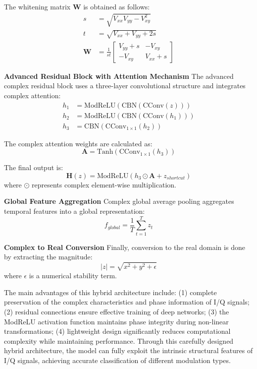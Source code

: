 \documentclass[conference]{IEEEtran}
\begin{document}
The whitening matrix $\mathbf{W}$ is obtained as follows:
\begin{align}
s &= \sqrt{V_{xx}V_{yy} - V_{xy}^2} \\
t &= \sqrt{V_{xx} + V_{yy} + 2s} \\
\mathbf{W} &= \frac{1}{st}\begin{bmatrix} V_{yy} + s & -V_{xy} \\ -V_{xy} & V_{xx} + s \end{bmatrix}
\end{align}

\textbf{Advanced Residual Block with Attention Mechanism} The advanced complex residual block uses a three-layer convolutional structure and integrates complex attention:
\begin{align}
h_1 &= \text{ModReLU}(\text{CBN}(\text{CConv}(z))) \\
h_2 &= \text{ModReLU}(\text{CBN}(\text{CConv}(h_1))) \\
h_3 &= \text{CBN}(\text{CConv}_{1 \times 1}(h_2))
\end{align}

The complex attention weights are calculated as:
\begin{equation}
\mathbf{A} = \text{Tanh}(\text{CConv}_{1 \times 1}(h_3))
\end{equation}

The final output is:
\begin{equation}
\mathbf{H}(z) = \text{ModReLU}(h_3 \odot \mathbf{A} + z_{shortcut})
\end{equation}
where $\odot$ represents complex element-wise multiplication.

\textbf{Global Feature Aggregation} Complex global average pooling aggregates temporal features into a global representation:
\begin{equation}
f_{global} = \frac{1}{T} \sum_{t=1}^T z_t
\end{equation}

\textbf{Complex to Real Conversion} Finally, conversion to the real domain is done by extracting the magnitude:
\begin{equation}
|z| = \sqrt{x^2 + y^2 + \epsilon}
\end{equation}
where $\epsilon$ is a numerical stability term.

The main advantages of this hybrid architecture include: (1) complete preservation of the complex characteristics and phase information of I/Q signals; (2) residual connections ensure effective training of deep networks; (3) the ModReLU activation function maintains phase integrity during non-linear transformations; (4) lightweight design significantly reduces computational complexity while maintaining performance. Through this carefully designed hybrid architecture, the model can fully exploit the intrinsic structural features of I/Q signals, achieving accurate classification of different modulation types.
\end{document}
